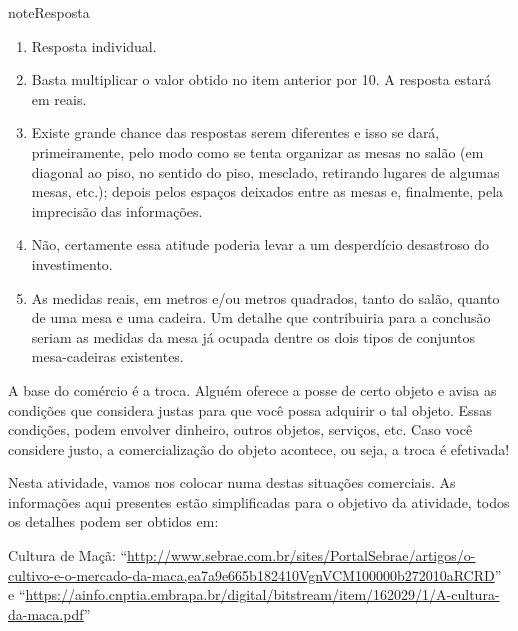\begin{sphinxadmonition}{note}{Resposta}
\begin{enumerate}
\item {} 
Resposta individual.

\item {} 
Basta multiplicar o valor obtido no item anterior por 10. A resposta estará em reais.

\item {} 
Existe grande chance das respostas serem diferentes e isso se dará, primeiramente, pelo modo como se tenta organizar as mesas no salão (em diagonal ao piso, no sentido do piso, mesclado, retirando lugares de algumas mesas, etc.); depois pelos espaços deixados entre as mesas e, finalmente, pela imprecisão das informações.

\item {} 
Não, certamente essa atitude poderia levar a um desperdício desastroso do investimento.

\item {} 
As medidas reais, em metros e/ou metros quadrados, tanto do salão, quanto de uma mesa e uma cadeira. Um detalhe que contribuiria para a conclusão seriam as medidas da mesa já ocupada dentre os dois tipos de conjuntos mesa-cadeiras existentes.

\end{enumerate}
\end{sphinxadmonition}

A base do comércio é a troca. Alguém oferece a posse de certo objeto e avisa as condições que considera justas para que você possa adquirir o tal objeto. Essas condições, podem envolver dinheiro, outros objetos, serviços, etc. Caso você considere justo, a comercialização do objeto acontece, ou seja, a troca é efetivada!

Nesta atividade, vamos nos colocar numa destas situações comerciais. As informações aqui presentes estão simplificadas para o objetivo da atividade, todos os detalhes podem ser obtidos em:

Cultura de Maçã: “\url{http://www.sebrae.com.br/sites/PortalSebrae/artigos/o-cultivo-e-o-mercado-da-maca,ea7a9e665b182410VgnVCM100000b272010aRCRD}” e “\url{https://ainfo.cnptia.embrapa.br/digital/bitstream/item/162029/1/A-cultura-da-maca.pdf}”

